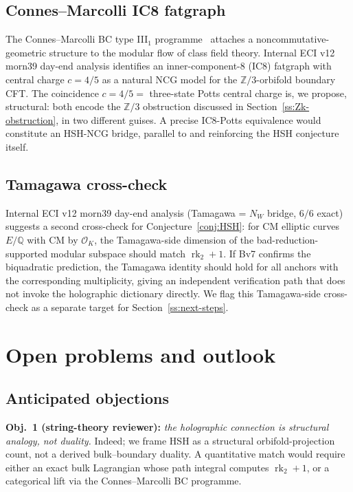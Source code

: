 \documentclass[11pt,a4paper]{amsart}
\theoremstyle{definition}
\DeclareMathOperator{\rk}{rk}
\newcommand{\Q}{\mathbb{Q}}
\newcommand{\Z}{\mathbb{Z}}
\newcommand{\OK}{\mathcal{O}_K}
\newcommand{\rktwo}{\rk_{2}}
\begin{document}
\subsection{Connes--Marcolli IC8 fatgraph}\label{ss:IC8}

The Connes--Marcolli BC type III$_1$ programme~\cite{ConnesMarcolli2008} attaches a
noncommutative-geometric structure to the modular flow of class field theory. Internal
ECI v12 morn39 day-end analysis identifies an inner-component-$8$ (IC8) fatgraph with
central charge $c = 4/5$ as a natural NCG model for the $\Z/3$-orbifold boundary CFT.
The coincidence $c = 4/5 =$ three-state Potts central charge is, we propose, structural:
both encode the $\Z/3$ obstruction discussed in Section~\ref{ss:Zk-obstruction}, in
two different guises. A precise IC8-Potts equivalence would constitute an HSH-NCG
bridge, parallel to and reinforcing the HSH conjecture itself.

\subsection{Tamagawa cross-check}\label{ss:Tamagawa}

Internal ECI v12 morn39 day-end analysis (Tamagawa = $N_W$ bridge, $6/6$ exact) suggests
a second cross-check for Conjecture~\ref{conj:HSH}: for CM elliptic curves $E/\Q$ with
CM by $\OK$, the Tamagawa-side dimension of the bad-reduction-supported modular subspace
should match $\rktwo + 1$. If Bv7 confirms the biquadratic prediction, the Tamagawa
identity should hold for all anchors with the corresponding multiplicity, giving an
independent verification path that does not invoke the holographic dictionary directly.
We flag this Tamagawa-side cross-check as a separate target for Section~\ref{ss:next-steps}.

\section{Open problems and outlook}\label{sec:open-problems}

\subsection{Anticipated objections}\label{ss:objections}

\textbf{Obj.\ 1 (string-theory reviewer):} \emph{the holographic connection is structural
analogy, not duality.} Indeed; we frame HSH as a structural orbifold-projection count,
not a derived bulk--boundary duality. A quantitative match would require either an exact
bulk Lagrangian whose path integral computes $\rktwo + 1$, or a categorical lift via the
Connes--Marcolli BC programme.
\end{document}
